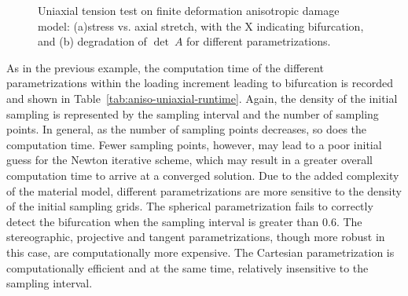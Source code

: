 \documentclass[12pt]{article}
\numberwithin{equation}{section}
\begin{document}
\begin{figure}[!htbp]
  \centering {} 
  \caption{Uniaxial tension test on finite deformation anisotropic
    damage model: (a)stress vs. axial stretch, with the X indicating
    bifurcation, and (b) degradation of $\det~A$ for different
    parametrizations.}
  \label{fig:aniso-stress_stretch}
\end{figure}

As in the previous example, the computation time of the different
parametrizations within the loading increment leading to bifurcation
is recorded and shown in
Table~\ref{tab:aniso-uniaxial-runtime}. Again, the density of the
initial sampling is represented by the sampling interval and the
number of sampling points. In general, as the number of sampling
points decreases, so does the computation time.  Fewer sampling
points, however, may lead to a poor initial guess for the Newton
iterative scheme, which may result in a greater overall computation
time to arrive at a converged solution. Due to the added complexity of
the material model, different parametrizations are more sensitive to
the density of the initial sampling grids. The spherical
parametrization fails to correctly detect the bifurcation when the
sampling interval is greater than 0.6. The stereographic, projective
and tangent parametrizations, though more robust in this case, are
computationally more expensive.  The Cartesian parametrization is
computationally efficient and at the same time, relatively insensitive
to the sampling interval.
\end{document}
